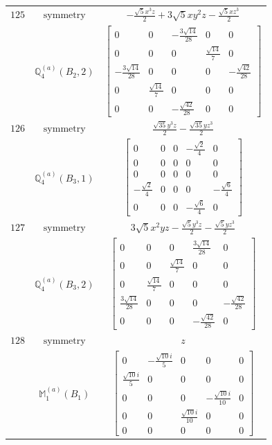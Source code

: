 \documentclass[fleqn,8pt,landscape]{jsarticle}
\begin{document}
\begin{longtable}{ccc}
$ 125 $ & $ \text{symmetry} $ & $ - \frac{\sqrt{5} x^{3} z}{2} + 3 \sqrt{5} x y^{2} z - \frac{\sqrt{5} x z^{3}}{2} $ \\
$  $ & $ \mathbb{Q}_{4}^{(a)}(B_{2},2) $ & $ \begin{bmatrix} 0 & 0 & - \frac{3 \sqrt{14}}{28} & 0 & 0 \\ 0 & 0 & 0 & \frac{\sqrt{14}}{7} & 0 \\ - \frac{3 \sqrt{14}}{28} & 0 & 0 & 0 & - \frac{\sqrt{42}}{28} \\ 0 & \frac{\sqrt{14}}{7} & 0 & 0 & 0 \\ 0 & 0 & - \frac{\sqrt{42}}{28} & 0 & 0 \end{bmatrix} $ \\ \hline
$ 126 $ & $ \text{symmetry} $ & $ \frac{\sqrt{35} y^{3} z}{2} - \frac{\sqrt{35} y z^{3}}{2} $ \\
$  $ & $ \mathbb{Q}_{4}^{(a)}(B_{3},1) $ & $ \begin{bmatrix} 0 & 0 & 0 & - \frac{\sqrt{2}}{4} & 0 \\ 0 & 0 & 0 & 0 & 0 \\ 0 & 0 & 0 & 0 & 0 \\ - \frac{\sqrt{2}}{4} & 0 & 0 & 0 & - \frac{\sqrt{6}}{4} \\ 0 & 0 & 0 & - \frac{\sqrt{6}}{4} & 0 \end{bmatrix} $ \\ \hline
$ 127 $ & $ \text{symmetry} $ & $ 3 \sqrt{5} x^{2} y z - \frac{\sqrt{5} y^{3} z}{2} - \frac{\sqrt{5} y z^{3}}{2} $ \\
$  $ & $ \mathbb{Q}_{4}^{(a)}(B_{3},2) $ & $ \begin{bmatrix} 0 & 0 & 0 & \frac{3 \sqrt{14}}{28} & 0 \\ 0 & 0 & \frac{\sqrt{14}}{7} & 0 & 0 \\ 0 & \frac{\sqrt{14}}{7} & 0 & 0 & 0 \\ \frac{3 \sqrt{14}}{28} & 0 & 0 & 0 & - \frac{\sqrt{42}}{28} \\ 0 & 0 & 0 & - \frac{\sqrt{42}}{28} & 0 \end{bmatrix} $ \\ \hline
$ 128 $ & $ \text{symmetry} $ & $ z $ \\
$  $ & $ \mathbb{M}_{1}^{(a)}(B_{1}) $ & $ \begin{bmatrix} 0 & - \frac{\sqrt{10} i}{5} & 0 & 0 & 0 \\ \frac{\sqrt{10} i}{5} & 0 & 0 & 0 & 0 \\ 0 & 0 & 0 & - \frac{\sqrt{10} i}{10} & 0 \\ 0 & 0 & \frac{\sqrt{10} i}{10} & 0 & 0 \\ 0 & 0 & 0 & 0 & 0 \end{bmatrix} $ \\ \hline

\end{longtable}
\end{document}
